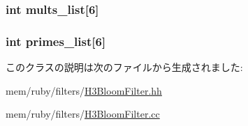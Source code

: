\label{classH3BloomFilter_a3d9d1bb83f31a4494f3247207e98cabd}
\hypertarget{classH3BloomFilter_a318639d0e1158ee41a59e8766465d799}{
\subsubsection[{mults\_\-list}]{\setlength{\rightskip}{0pt plus 5cm}int {\bf mults\_\-list}\mbox{[}6\mbox{]}}}
\label{classH3BloomFilter_a318639d0e1158ee41a59e8766465d799}
\hypertarget{classH3BloomFilter_a4b46818f030c83dec3f833b5882a6ef6}{
\subsubsection[{primes\_\-list}]{\setlength{\rightskip}{0pt plus 5cm}int {\bf primes\_\-list}\mbox{[}6\mbox{]}}}
\label{classH3BloomFilter_a4b46818f030c83dec3f833b5882a6ef6}


このクラスの説明は次のファイルから生成されました:\begin{DoxyCompactItemize}
\item 
mem/ruby/filters/\hyperlink{H3BloomFilter_8hh}{H3BloomFilter.hh}\item 
mem/ruby/filters/\hyperlink{H3BloomFilter_8cc}{H3BloomFilter.cc}\end{DoxyCompactItemize}
